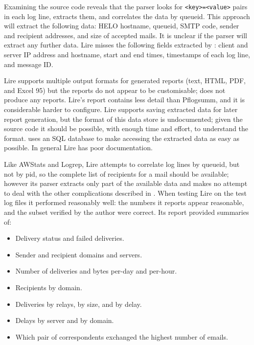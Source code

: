 \noindent{}Examining the source code reveals that the parser looks for
\texttt{<key>=<value>} pairs in each log line, extracts them, and
correlates the data by queueid.  This approach will extract the following
data: HELO hostname, queueid, \gls{SMTP} code, sender and recipient
addresses, and size of accepted mails.  It is unclear if the parser will
extract any further data.  Lire misses the following fields extracted by
\parsername{}: client and server \gls{IP} address and hostname, start and
end times, timestamps of each log line, and message ID\@. 

Lire supports multiple output formats for generated reports (text, HTML,
PDF, and Excel 95) but the reports do not appear to be customisable;
\parsername{} does not produce any reports.  Lire's report contains less
detail than Pflogsumm, and it is considerable harder to configure.  Lire
supports saving extracted data for later report generation, but the format
of this data store is undocumented; given the source code it should be
possible, with enough time and effort, to understand the format.
\parsername{} uses an \gls{SQL} database to make accessing the extracted
data as easy as possible.  In general Lire has poor documentation.

Like AWStats and Logrep, Lire attempts to correlate log lines by queueid,
but not by \gls{pid}, so the complete list of recipients for a mail should
be available; however its parser extracts only part of the available data
and makes no attempt to deal with the other complications described in
.  When testing Lire on the \numberOFlogFILES{}
test log files it performed reasonably well: the numbers it reports appear
reasonable, and the subset verified by the author were correct.  Its report
provided summaries of: 

\begin{itemize}

    \item Delivery status and failed deliveries.

    \item Sender and recipient domains and servers.

    \item Number of deliveries and bytes per-day and per-hour.

    \item Recipients by domain.

    \item Deliveries by relays, by size, and by delay.

    \item Delays by server and by domain.

    \item Which pair of correspondents exchanged the highest number of
        emails.

\end{itemize}

